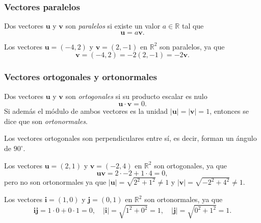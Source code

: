 \begin{frame}
\frametitle{Vectores paralelos}
\begin{definicion}
Dos vectores $\mathbf{u}$ y $\mathbf{v}$ son \emph{paralelos} si existe un valor $a\in\mathbb{R}$ tal que
\[
\mathbf{u} = a\mathbf{v}.
\]
\end{definicion}

Los vectores $\mathbf{u}=(-4,2)$ y $\mathbf{v}=(2,-1)$ en $\mathbb{R}^2$ son paralelos, ya que
\[
\mathbf{v}= (-4,2) = -2(2,-1) = -2\mathbf{v}.
\]

\end{frame} 


\begin{frame}
\frametitle{Vectores ortogonales y ortonormales}
\begin{definicion}
Dos vectores $\mathbf{u}$ y $\mathbf{v}$ son \emph{ortogonales} si su producto escalar es nulo
\[
\mathbf{u}\cdot \mathbf{v} = 0.
\]
Si además el módulo de ambos vectores es la unidad $|\mathbf{u}|=|\mathbf{v}|=1$, entonces se dice que son \emph{ortonormales}.
\end{definicion}

Los vectores ortogonales son perpendiculares entre sí, es decir, forman un ángulo de $90^\circ$.

Los vectores $\mathbf{u}=(2,1)$ y $\mathbf{v}=(-2,4)$ en $\mathbb{R}^2$ son ortogonales, ya que
\[
\mathbf{u}\mathbf{v} = 2\cdot -2 +1\cdot 4 = 0,
\]
pero no son ortonormales ya que $|\mathbf{u}| = \sqrt{2^2+1^2} \neq 1$ y  $|\mathbf{v}| = \sqrt{-2^2+4^2} \neq 1$.

Los vectores $\mathbf{i}=(1,0)$ y $\mathbf{j}=(0,1)$ en $\mathbb{R}^2$ son ortonormales, ya que
\[
\mathbf{i}\mathbf{j} = 1\cdot 0 +0\cdot 1 = 0, \quad |\mathbf{i}| = \sqrt{1^2+0^2} = 1,  \quad |\mathbf j| = \sqrt{0^2+1^2} = 1.
\]
\end{frame}  



